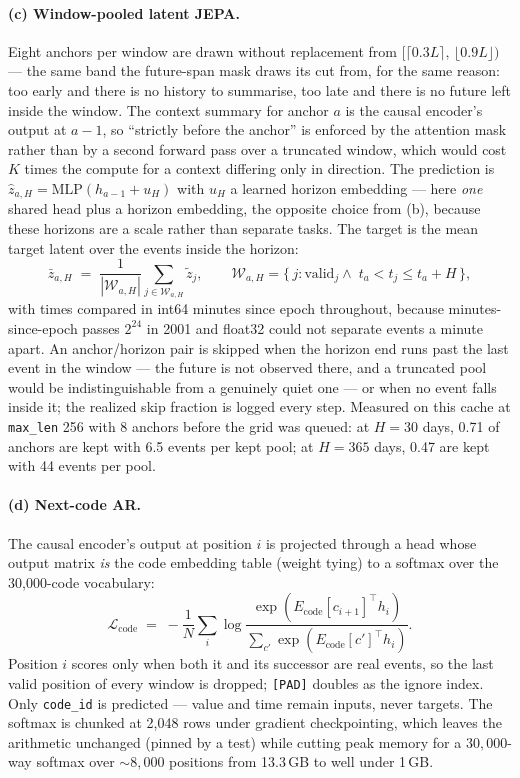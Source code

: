\documentclass[11pt,a4paper]{article}
\newcommand{\code}[1]{\texttt{\small #1}}
\begin{document}
\paragraph{(c) Window-pooled latent JEPA.}
Eight anchors per window are drawn without replacement from
$[\lceil 0.3L\rceil,\, \lfloor 0.9L\rfloor)$ --- the same band the future-span
mask draws its cut from, for the same reason: too early and there is no history
to summarise, too late and there is no future left inside the window. The
context summary for anchor $a$ is the causal encoder's output at $a-1$, so
``strictly before the anchor'' is enforced by the attention mask rather than by
a second forward pass over a truncated window, which would cost $K$ times the
compute for a context differing only in direction. The prediction is
$\hat z_{a,H} = \mathrm{MLP}(h_{a-1} + u_H)$ with $u_H$ a learned horizon
embedding --- here \emph{one} shared head plus a horizon embedding, the opposite
choice from (b), because these horizons are a scale rather than separate tasks.
The target is the mean target latent over the events inside the horizon:
\begin{equation}
\bar z_{a,H} \;=\;
\frac{1}{|\mathcal{W}_{a,H}|}\sum_{j \in \mathcal{W}_{a,H}} \tilde z_j,
\qquad
\mathcal{W}_{a,H} = \{\, j : \text{valid}_j \wedge\;
t_a < t_j \le t_a + H \,\},
\end{equation}
with times compared in int64 minutes since epoch throughout, because
minutes-since-epoch passes $2^{24}$ in 2001 and float32 could not separate
events a minute apart. An anchor/horizon pair is skipped when the horizon end
runs past the last event in the window --- the future is not observed there, and
a truncated pool would be indistinguishable from a genuinely quiet one --- or
when no event falls inside it; the realized skip fraction is logged every step.
Measured on this cache at \code{max\_len} 256 with 8 anchors before the grid was
queued: at $H = 30$ days, 0.71 of anchors are kept with 6.5 events per kept
pool; at $H = 365$ days, 0.47 are kept with 44 events per pool.

\paragraph{(d) Next-code AR.}
The causal encoder's output at position $i$ is projected through a head whose
output matrix \emph{is} the code embedding table (weight tying) to a softmax
over the 30{,}000-code vocabulary:
\begin{equation}
\mathcal{L}_{\mathrm{code}}
\;=\;
-\frac{1}{N}\sum_{i} \log
\frac{\exp\!\left(E_{\mathrm{code}}[c_{i+1}]^{\!\top} h_i\right)}
     {\sum_{c'} \exp\!\left(E_{\mathrm{code}}[c']^{\!\top} h_i\right)}.
\end{equation}
Position $i$ scores only when both it and its successor are real events, so the
last valid position of every window is dropped; \code{[PAD]} doubles as the
ignore index. Only \code{code\_id} is predicted --- value and time remain inputs,
never targets. The softmax is chunked at 2{,}048 rows under gradient
checkpointing, which leaves the arithmetic unchanged (pinned by a test) while
cutting peak memory for a $30{,}000$-way softmax over ${\sim}8{,}000$ positions
from 13.3\,GB to well under 1\,GB.
\end{document}
